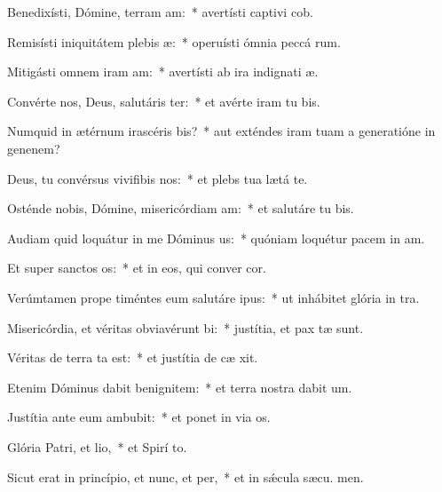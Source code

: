 \item Benedixísti, Dómine, terram am:~* avertísti captivi cob.
\item Remisísti iniquitátem plebis æ:~* operuísti ómnia peccá rum.
\item Mitigásti omnem iram am:~* avertísti ab ira indignati æ.
\item Convérte nos, Deus, salutáris ter:~* et avérte iram tu  bis.
\item Numquid in ætérnum irascéris bis?~* aut exténdes iram tuam a generatióne in genenem?
\item Deus, tu convérsus vivifibis nos:~* et plebs tua lætá  te.
\item Osténde nobis, Dómine, misericórdiam am:~* et salutáre tu  bis.
\item Audiam quid loquátur in me Dóminus us:~* quóniam loquétur pacem in  am.
\item Et super sanctos os:~* et in eos, qui conver  cor.
\item Verúmtamen prope timéntes eum salutáre ipus:~* ut inhábitet glória in  tra.
\item Misericórdia, et véritas obviavérunt bi:~* justítia, et pax tæ sunt.
\item Véritas de terra ta est:~* et justítia de cæ xit.
\item Etenim Dóminus dabit benignitem:~* et terra nostra dabit  um.
\item Justítia ante eum ambubit:~* et ponet in via  os.
\item Glória Patri, et lio,~* et Spirí to.
\item Sicut erat in princípio, et nunc, et per,~* et in sǽcula sæcu. men.
